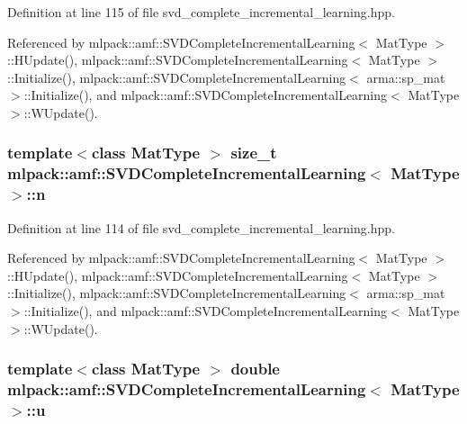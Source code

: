 Definition at line 115 of file svd\-\_\-complete\-\_\-incremental\-\_\-learning.\-hpp.



Referenced by mlpack\-::amf\-::\-S\-V\-D\-Complete\-Incremental\-Learning$<$ Mat\-Type $>$\-::\-H\-Update(), mlpack\-::amf\-::\-S\-V\-D\-Complete\-Incremental\-Learning$<$ Mat\-Type $>$\-::\-Initialize(), mlpack\-::amf\-::\-S\-V\-D\-Complete\-Incremental\-Learning$<$ arma\-::sp\-\_\-mat $>$\-::\-Initialize(), and mlpack\-::amf\-::\-S\-V\-D\-Complete\-Incremental\-Learning$<$ Mat\-Type $>$\-::\-W\-Update().

\subsubsection[{n}]{\setlength{\rightskip}{0pt plus 5cm}template$<$class Mat\-Type $>$ size\-\_\-t {\bf mlpack\-::amf\-::\-S\-V\-D\-Complete\-Incremental\-Learning}$<$ Mat\-Type $>$\-::n\hspace{0.3cm}{\ttfamily [private]}}\label{classmlpack_1_1amf_1_1SVDCompleteIncrementalLearning_a195d217236b9f252072d35d23731cfda}


Definition at line 114 of file svd\-\_\-complete\-\_\-incremental\-\_\-learning.\-hpp.



Referenced by mlpack\-::amf\-::\-S\-V\-D\-Complete\-Incremental\-Learning$<$ Mat\-Type $>$\-::\-H\-Update(), mlpack\-::amf\-::\-S\-V\-D\-Complete\-Incremental\-Learning$<$ Mat\-Type $>$\-::\-Initialize(), mlpack\-::amf\-::\-S\-V\-D\-Complete\-Incremental\-Learning$<$ arma\-::sp\-\_\-mat $>$\-::\-Initialize(), and mlpack\-::amf\-::\-S\-V\-D\-Complete\-Incremental\-Learning$<$ Mat\-Type $>$\-::\-W\-Update().

\subsubsection[{u}]{\setlength{\rightskip}{0pt plus 5cm}template$<$class Mat\-Type $>$ double {\bf mlpack\-::amf\-::\-S\-V\-D\-Complete\-Incremental\-Learning}$<$ Mat\-Type $>$\-::u\hspace{0.3cm}{\ttfamily [private]}}\label{classmlpack_1_1amf_1_1SVDCompleteIncrementalLearning_ae5359f509bf44dbf3dc17a0ff6809fb4}


